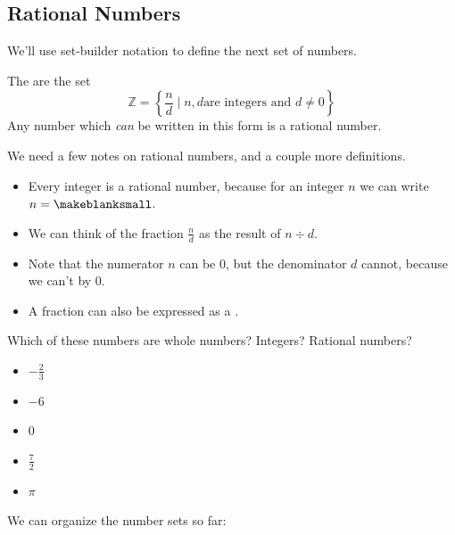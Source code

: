 \subsection{Rational Numbers}
We'll use set-builder notation to define the next set of numbers.
\begin{definition}
The  are the set
\[
\mathbb{Z}=\left\{\frac{n}{d}\mid n,d\mbox {are integers and }d\neq 0\right\}
\]
Any number which \emph{can} be written in this form is a rational number.
\end{definition}
We need a few notes on rational numbers, and a couple more definitions.
\begin{itemize}
\item Every integer is a rational number, because for an integer $n$ we can write\linebreak$n=\makeblanksmall$.
\item We can think of the fraction $\frac{n}{d}$ as the result of $n\div d$.
\item Note that the numerator $n$ can be 0, but the denominator $d$ cannot, because we can't \makeblank[1in] by 0.
\item A fraction can also be expressed as a \makeblank.
\end{itemize}
\begin{Example}
Which of these numbers are whole numbers? Integers? Rational numbers?
\begin{itemize}
\item $-\frac{2}{3}$   
\makeblanknew
\item $-6$   
\makeblanknew
\item $0$   
\makeblanknew
\item $\frac{7}{2}$   
\makeblanknew
\item $\pi$   
\makeblanknew
\end{itemize}
\end{Example}
We can organize the number sets so far:
\begin{center}
\end{center}